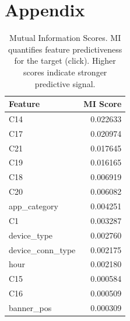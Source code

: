 \documentclass[12pt]{article}
\begin{document}
\section*{Appendix}
\begin{table}[H]
\centering
\small
\begin{tabular}{lr}
\toprule
\textbf{Feature} & \textbf{MI Score} \\
\midrule
C14 & 0.022633 \\
C17 & 0.020974 \\
C21 & 0.017645 \\
C19 & 0.016165 \\
C18 & 0.006919 \\
C20 & 0.006082 \\
app\_category & 0.004251 \\
C1 & 0.003287 \\
device\_type & 0.002760 \\
device\_conn\_type & 0.002175 \\
hour & 0.002180 \\
C15 & 0.000584 \\
C16 & 0.000509 \\
banner\_pos & 0.000309 \\
\bottomrule
\end{tabular}
\caption{Mutual Information Scores. MI quantifies feature predictiveness for the target (click). Higher scores indicate stronger predictive signal.}
\label{tab:mi}
\end{table}
\end{document}
